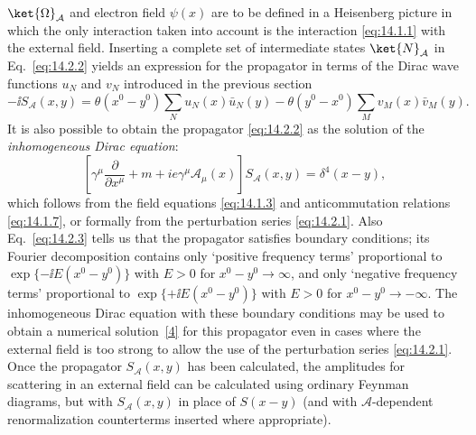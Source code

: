 $\ket{\Omega}_{\mathcal A}$ and electron field $\psi(x)$ are to be defined in a
Heisenberg picture in which the only interaction taken into account is the
interaction \eqref{eq:14.1.1} with the external field. Inserting a complete set of
intermediate states $\ket{N}_{\mathcal A}$ in Eq.~\eqref{eq:14.2.2} yields an
expression for the propagator in terms of the Dirac wave functions $u_N$ and
$v_N$ introduced in the previous section
\begin{equation}
 -\ii S_{\mathcal A}(x,y)=\theta(x^0-y^0)\sum_Nu_N(x)\bar u_N(y)
 -\theta(y^0-x^0)\sum_Mv_M(x)\bar v_M(y).
 \tag{14.2.3}\label{eq:14.2.3}
\end{equation}
It is also possible to obtain the propagator \eqref{eq:14.2.2} as the solution of
the \emph{inhomogeneous Dirac equation}:
\begin{equation}
 \left[\gamma^\mu\frac{\partial}{\partial x^\mu}+m
 +ie\gamma^\mu\mathcal A_\mu(x)\right]S_{\mathcal A}(x,y)=\delta^4(x-y),
 \tag{14.2.4}\label{eq:14.2.4}
\end{equation}
which follows from the field equations \eqref{eq:14.1.3} and anticommutation
relations \eqref{eq:14.1.7}, or formally from the perturbation series
\eqref{eq:14.2.1}. Also Eq.~\eqref{eq:14.2.3} tells us that the propagator satisfies
boundary conditions; its Fourier decomposition contains only `positive
frequency terms' proportional to $\exp\{-\ii E(x^0-y^0)\}$ with $E>0$ for
$x^0-y^0\to\infty$, and only `negative frequency terms' proportional to
$\exp\{+\ii E(x^0-y^0)\}$ with $E>0$ for $x^0-y^0\to-\infty$. The inhomogeneous
Dirac equation with these boundary conditions may be used to obtain a
numerical solution~\hyperlink{ref:14.4}{[4]} for this propagator even in cases
where the external field is too strong to allow the use of the perturbation
series \eqref{eq:14.2.1}. Once the propagator $S_{\mathcal A}(x,y)$ has been
calculated, the amplitudes for scattering in an external field can be
calculated using ordinary Feynman diagrams, but with $S_{\mathcal A}(x,y)$ in
place of $S(x-y)$ (and with $\mathcal A$-dependent renormalization counterterms
inserted where appropriate).

